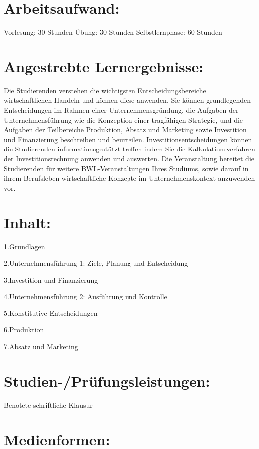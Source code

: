 \section{Arbeitsaufwand:}\label{arbeitsaufwand-6}

Vorlesung: 30 Stunden Übung: 30 Stunden Selbstlernphase: 60 Stunden

\section{Angestrebte
Lernergebnisse:}\label{angestrebte-lernergebnisse-6}

Die Studierenden verstehen die wichtigsten Entscheidungsbereiche
wirtschaftlichen Handeln und können diese anwenden. Sie können
grundlegenden Entscheidungen im Rahmen einer Unternehmensgründung, die
Aufgaben der Unternehmensführung wie die Konzeption einer tragfähigen
Strategie, und die Aufgaben der Teilbereiche Produktion, Absatz und
Marketing sowie Investition und Finanzierung beschreiben und beurteilen.
Investitionsentscheidungen können die Studierenden informationsgestützt
treffen indem Sie die Kalkulationsverfahren der Investitionsrechnung
anwenden und auswerten. Die Veranstaltung bereitet die Studierenden für
weitere BWL-Veranstaltungen Ihres Studiums, sowie darauf in ihrem
Berufsleben wirtschaftliche Konzepte im Unternehmenskontext anzuwenden
vor.

\section{Inhalt:}\label{inhalt-6}

1.Grundlagen

2.Unternehmensführung 1: Ziele, Planung und Entscheidung

3.Investition und Finanzierung

4.Unternehmensführung 2: Ausführung und Kontrolle

5.Konstitutive Entscheidungen

6.Produktion

7.Absatz und Marketing

\section{Studien-/Prüfungsleistungen:}\label{studien-pruxfcfungsleistungen-6}

Benotete schriftliche Klausur

\section{Medienformen:}\label{medienformen-6}

